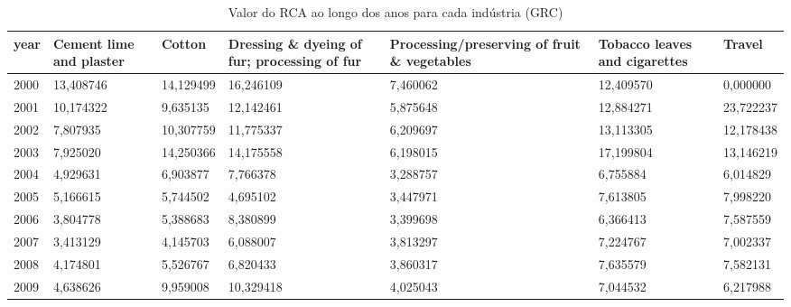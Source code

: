 \begin{table}
\centering
\caption{Valor do RCA ao longo dos anos para cada indústria (GRC)}
\begin{tabular}{p{1cm}p{2cm}p{2cm}p{2cm}p{2cm}p{2cm}p{2cm}}
\toprule
 year &  Cement lime and plaster &    Cotton &  Dressing \& dyeing of fur; processing of fur &  Processing/preserving of fruit \& vegetables &  Tobacco leaves and cigarettes &    Travel \\
\midrule
 2000 &                13,408746 & 14,129499 &                                    16,246109 &                                     7,460062 &                      12,409570 &  0,000000 \\
 2001 &                10,174322 &  9,635135 &                                    12,142461 &                                     5,875648 &                      12,884271 & 23,722237 \\
 2002 &                 7,807935 & 10,307759 &                                    11,775337 &                                     6,209697 &                      13,113305 & 12,178438 \\
 2003 &                 7,925020 & 14,250366 &                                    14,175558 &                                     6,198015 &                      17,199804 & 13,146219 \\
 2004 &                 4,929631 &  6,903877 &                                     7,766378 &                                     3,288757 &                       6,755884 &  6,014829 \\
 2005 &                 5,166615 &  5,744502 &                                     4,695102 &                                     3,447971 &                       7,613805 &  7,998220 \\
 2006 &                 3,804778 &  5,388683 &                                     8,380899 &                                     3,399698 &                       6,366413 &  7,587559 \\
 2007 &                 3,413129 &  4,145703 &                                     6,088007 &                                     3,813297 &                       7,224767 &  7,002337 \\
 2008 &                 4,174801 &  5,526767 &                                     6,820433 &                                     3,860317 &                       7,635579 &  7,582131 \\
 2009 &                 4,638626 &  9,959008 &                                    10,329418 &                                     4,025043 &                       7,044532 &  6,217988 \\

\end{tabular}
\end{table}
